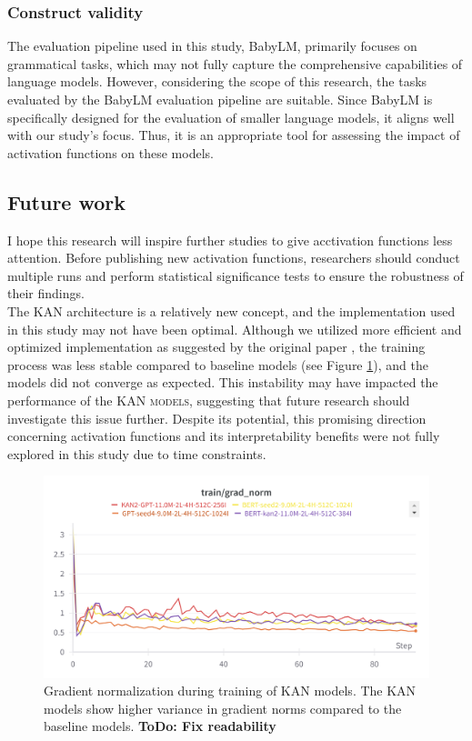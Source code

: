 \subsubsection{Construct validity}
The evaluation pipeline used in this study, BabyLM, primarily focuses on grammatical tasks, which may not fully capture the comprehensive capabilities of language models. However, considering the scope of this research, the tasks evaluated by the BabyLM evaluation pipeline are suitable. Since BabyLM is specifically designed for the evaluation of smaller language models, it aligns well with our study's focus. Thus, it is an appropriate tool for assessing the impact of activation functions on these models.

\subsection{Future work}
I hope this research will inspire further studies to give acctivation functions less attention. Before publishing new activation functions, researchers should conduct multiple runs and perform statistical significance tests to ensure the robustness of their findings. \\ 
The KAN architecture is a relatively new concept, and the implementation used in this study may not have been optimal. Although we utilized more efficient and optimized implementation as suggested by the original paper \cite{Liu2024}, the training process was less stable compared to baseline models (see Figure \ref{fig:grad-norm}), and the models did not converge as expected. This instability may have impacted the performance of the \textsc{KAN models}, suggesting that future research should investigate this issue further. Despite its potential, this promising direction concerning activation functions and its interpretability benefits were not fully explored in this study due to time constraints.

\begin{figure}[ht]
    \centering
    \includegraphics[width=\columnwidth]{figures/train-grad-norm.png}
    \caption{Gradient normalization during training of KAN models. The KAN models show higher variance in gradient norms compared to the baseline models. \textbf{ToDo: Fix readability}}
    \label{fig:grad-norm}
\end{figure}
